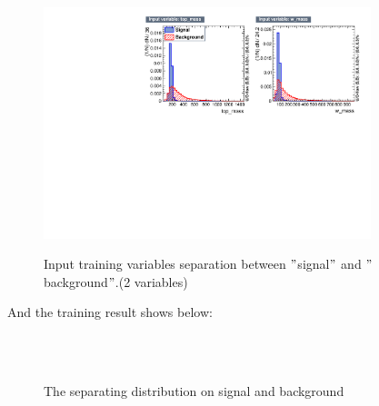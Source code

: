 			\begin{figure}[H]
			\centering{}
    			\includegraphics[width=0.85\textwidth]{Figures/EventSelReco/mva/a04_VarSep.pdf}\\
			\caption{Input training variables separation between $"$signal$"$ and $"$background$"$.(2 variables)}
			\label{EventSelReco:fig:a04_varsep}
			\end{figure}
			\FloatBarrier

			And the training result shows below:

			\begin{figure}[H]
			\centering
			    \\
			    \\
			\caption{The separating distribution on signal and background}
			\label{EventSelReco:fig:Sep_a04}
			\end{figure}
			\FloatBarrier

